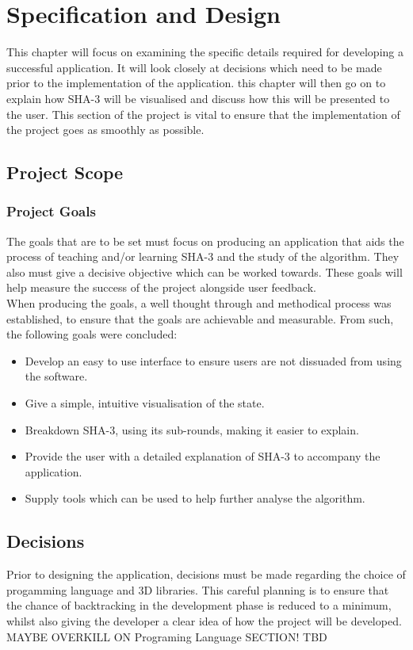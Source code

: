 \chapter{Specification and Design}
This chapter will focus on examining the specific details required for developing a successful application. It will look closely at decisions which need to be made prior to the implementation of the application. this chapter will then go on to explain how SHA-3 will be visualised and discuss how this will be presented to the user. This section of the project is vital to ensure that the implementation of the project goes as smoothly as possible.
\section{Project Scope}
\subsection{Project Goals}
The goals that are to be set must focus on producing an application that aids the process of teaching and/or learning SHA-3 and the study of the algorithm. They also must give a decisive objective which can be worked towards. These goals will help measure the success of the project alongside user feedback.
\vspace{5 mm}\\
When producing the goals, a well thought through and methodical process was established, to ensure that the goals are achievable and measurable. From such, the following goals were concluded:
\begin{itemize}
\item Develop an easy to use interface to ensure users are not dissuaded from using the software.
\item Give a simple, intuitive visualisation of the state. 
\item Breakdown SHA-3, using its sub-rounds, making it easier to explain.
\item Provide the user with a detailed explanation of SHA-3 to accompany the application.
\item Supply tools which can be used to help further analyse the algorithm.
\end{itemize}
\section{Decisions}
Prior to designing the application, decisions must be made regarding the choice of progamming language and 3D libraries. This careful planning is to ensure that the chance of backtracking in the development phase is reduced to a minimum, whilst also giving the developer a clear idea of how the project will be developed.
\vspace{20 mm}\\
MAYBE OVERKILL ON Programing Language SECTION! TBD
